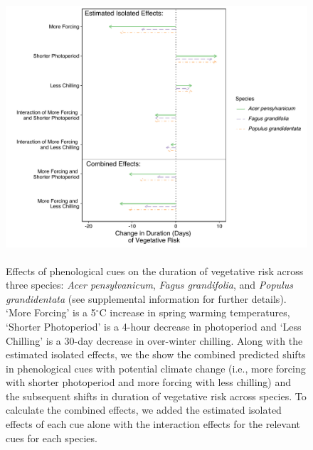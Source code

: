 \documentclass{article}\usepackage[]{graphicx}\usepackage[]{color}
\begin{document}
\begin{figure} [H] 
 \begin{center}
 \includegraphics[width=14cm, height=10cm]{..//figures/exp_intrxns_dvr_color.pdf} 
 \caption{Effects of phenological cues on the duration of vegetative risk across three species: \textit{Acer pensylvanicum}, \textit{Fagus grandifolia}, and \textit{Populus grandidentata} (see supplemental information for further details). `More Forcing' is a 5$^{\circ}$C increase in spring warming temperatures, `Shorter Photoperiod' is a 4-hour decrease in photoperiod and `Less Chilling' is a 30-day decrease in over-winter chilling. Along with the estimated isolated effects, we the show the combined predicted shifts in phenological cues with potential climate change (i.e., more forcing with shorter photoperiod and more forcing with less chilling) and the subsequent shifts in duration of vegetative risk across species. To calculate the combined effects, we added the estimated isolated effects of each cue alone with the interaction effects for the relevant cues for each species.}\label{fig:dan} 
 \end{center}
 \end{figure}
\end{document}
